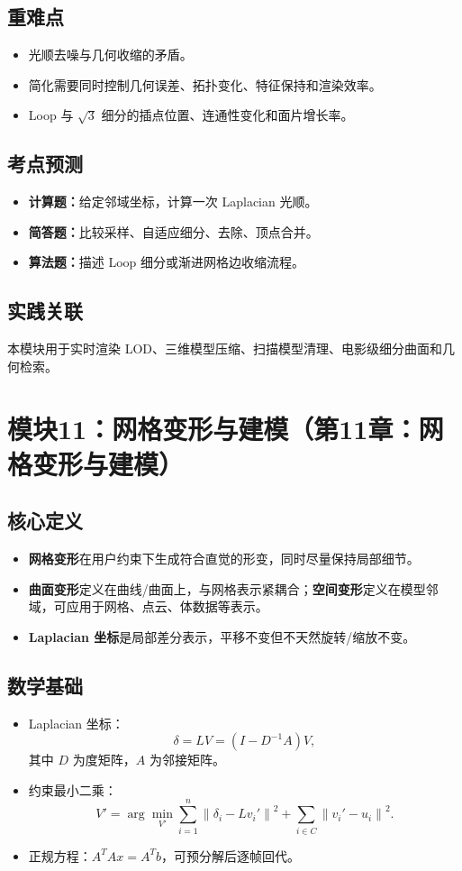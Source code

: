 \documentclass[UTF8,fontset=fandol,11pt]{ctexart}
\newcommand{\key}[1]{\textbf{#1}}
\newcommand{\exam}[1]{\textcolor{blue!55!black}{\textbf{#1}}}
\newcommand{\norm}[1]{\left\lVert #1 \right\rVert}
\begin{document}
\subsection{重难点}
\begin{itemize}
  \item 光顺去噪与几何收缩的矛盾。
  \item 简化需要同时控制几何误差、拓扑变化、特征保持和渲染效率。
  \item Loop 与 $\sqrt{3}$ 细分的插点位置、连通性变化和面片增长率。
\end{itemize}
\subsection{考点预测}
\begin{itemize}
  \item \exam{计算题：}给定邻域坐标，计算一次 Laplacian 光顺。
  \item \exam{简答题：}比较采样、自适应细分、去除、顶点合并。
  \item \exam{算法题：}描述 Loop 细分或渐进网格边收缩流程。
\end{itemize}
\subsection{实践关联}
本模块用于实时渲染 LOD、三维模型压缩、扫描模型清理、电影级细分曲面和几何检索。

\section{模块11：网格变形与建模（第11章：网格变形与建模）}
\subsection{核心定义}
\begin{itemize}
  \item \key{网格变形}在用户约束下生成符合直觉的形变，同时尽量保持局部细节。
  \item \key{曲面变形}定义在曲线/曲面上，与网格表示紧耦合；\key{空间变形}定义在模型邻域，可应用于网格、点云、体数据等表示。
  \item \key{Laplacian 坐标}是局部差分表示，平移不变但不天然旋转/缩放不变。
\end{itemize}
\subsection{数学基础}
\begin{itemize}
  \item Laplacian 坐标：
  \[
    \delta=LV=(I-D^{-1}A)V,
  \]
  其中 $D$ 为度矩阵，$A$ 为邻接矩阵。
  \item 约束最小二乘：
  \[
    V'=\arg\min_{V'}\sum_{i=1}^n\norm{\delta_i-Lv_i'}^2+\sum_{i\in C}\norm{v_i'-u_i}^2.
  \]
  \item 正规方程：$A^TAx=A^Tb$，可预分解后逐帧回代。
\end{itemize}
\end{document}
